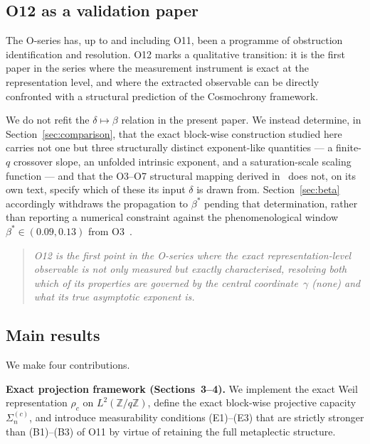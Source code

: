 \documentclass[11pt,a4paper]{article}
\begin{document}
  \subsection{O12 as a validation paper}

    The O-series has, up to and including O11, been a programme of obstruction
    identification and resolution.
    O12 marks a qualitative transition: it is the first paper in the series
    where the measurement instrument is exact at the representation level,
    and where the extracted observable can be directly confronted with a
    structural prediction of the Cosmochrony framework.

    We do not refit the $\delta\mapsto\beta$ relation in the present paper.
    We instead determine, in Section~\ref{sec:comparison}, that the exact block-wise
    construction studied here carries not one but three structurally distinct exponent-like
    quantities — a finite-$q$ crossover slope, an unfolded intrinsic exponent, and a
    saturation-scale scaling function — and that the O3--O7 structural mapping
    derived in~\cite{Beau2026a7,Beau2026a8,Beau2026a9,Beau2026a10,Beau2026a11} does not, on
    its own text, specify which of these its input $\delta$ is drawn from.
    Section~\ref{sec:beta} accordingly withdraws the propagation to $\beta^*$ pending that
    determination, rather than reporting a numerical constraint against the phenomenological
    window $\beta^*\in(0.09,0.13)$ from O3~\cite{Beau2026a7}.

    \begin{quote}
      \textit{O12 is the first point in the O-series where the exact representation-level
      observable is not only measured but exactly characterised, resolving both which of
      its properties are governed by the central coordinate~$\gamma$ (none) and what its
      true asymptotic exponent is.}
    \end{quote}

  \subsection{Main results}

    We make four contributions.

    \textbf{Exact projection framework (Sections~3--4).}
    We implement the exact Weil representation $\rho_c$ on $L^2(\mathbb{Z}/q\mathbb{Z})$,
    define the exact block-wise projective capacity $\Sigma_n^{(c)}$, and introduce
    measurability conditions (E1)--(E3) that are strictly stronger than (B1)--(B3) of O11
    by virtue of retaining the full metaplectic structure.
\end{document}
